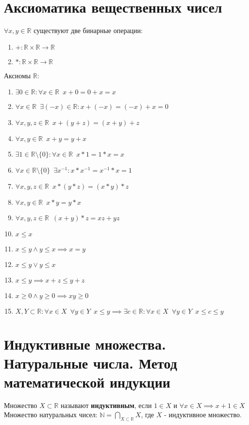 \documentclass[11pt, a4paper]{article}
\def\R{\mathbb{R}}
\def\N{\mathbb{N}}
\def\sp{\, \, \,}
\begin{document}
    \tableofcontents \pagebreak
    \noindent


    \section{Аксиоматика вещественных чисел}
    $\forall x,y \in \R$ существуют две бинарные операции:
    \begin{enumerate}
        \item $+: \R \times \R \to \R$
        \item $*: \R \times \R \to \R$
    \end{enumerate}

    Аксиомы $\R$:
    \begin{enumerate}
        \item $\exists 0 \in \R : \forall x \in \R \sp x + 0 = 0 + x = x$
        \item $\forall x \in \R \sp \exists (-x) \in \R: x + (-x) = (-x) + x = 0$
        \item $\forall x,y,z \in \R \sp x+(y+z)=(x+y)+z$
        \item $\forall x,y \in \R \sp x+y = y+x$
        \item $\exists 1 \in \R \setminus \{0\}: \forall x \in \R \sp x*1 = 1*x = x$
        \item $\forall x \in \R \setminus \{0\} \sp \exists x^{-1}: x*x^{-1} = x^{-1}*x = 1$
        \item $\forall x,y,z \in \R \sp x*(y*z)=(x*y)*z$
        \item $\forall x,y \in \R \sp x*y = y*x$
        \item $\forall x,y,z \in \R \sp (x+y)*z=xz + yz$
        \item $x \leq x$
        \item $x \leq y \land y \leq x \implies x = y$
        \item $x \leq y \lor y \leq x$
        \item $x \leq y \implies x+z \leq y+z$
        \item $x \geq 0 \land y \geq 0 \implies xy \geq 0$
        \item $X, Y \subset \R: \forall x \in X \sp \forall y \in Y \sp x \leq y \implies \exists c \in \R: \forall x \in X \sp \forall y \in Y \sp x \leq c \leq y$
    \end{enumerate}

    \section{Индуктивные множества. Натуральные числа. Метод математической индукции}
    Множество $X \subset \R$ называют \textbf{индуктивным}, если $1 \in X$ и $\forall x \in X \implies x+1 \in X$\\
    Множество натуральных чисел: $\displaystyle \N = \bigcap_{X \subset \R} X$, где $X$ - индуктивное множество.
    
\end{document}
